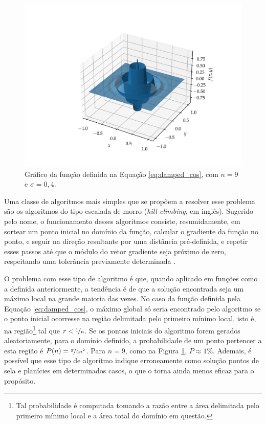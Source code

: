 \begin{figure}
  \centering
  \includegraphics[width=\textwidth]{imagens/damped_cossine.png}
  \caption{Gráfico da função definida na Equação \ref{eq:damped_cos}, com $ n = 9 $ e $ \sigma = 0,4 $.}
  \label{fig:damped_cos}
\end{figure}

Uma classe de algoritmos mais simples que se propõem a resolver esse problema são os algoritmos do
tipo escalada de morro (\textit{hill climbing}, em inglês). 
Sugerido pelo nome, o funcionamento desses algoritmos consiste, resumidamente,
em sortear um ponto inicial no domínio da função, calcular o gradiente da função no ponto, e seguir
na direção resultante por uma distância pré-definida, e repetir esses passos até que o módulo do
vetor gradiente seja próximo de zero, respeitando uma tolerância previamente determinada  \cite{goldberg1989ga}. 

O problema com esse tipo de algoritmo é que, quando aplicado em funções como a definida anteriormente, a tendência é
de que a solução encontrada seja um máximo local na grande maioria das vezes. No caso da função definida
pela Equação \ref{eq:damped_cos}, o máximo global só seria encontrado pelo algoritmo se o ponto inicial
ocorresse na região delimitada pelo primeiro mínimo local, isto é, na região\footnote{
  Tal probabilidade é computada tomando a razão entre a área delimitada pelo primeiro mínimo local
  e a área total do domínio em questão.
}
tal que $ r < \nicefrac{1}{n} $. 
Se os pontos iniciais do algoritmo forem gerados aleatoriamente,
para o domínio definido, a probabilidade de um ponto pertencer a esta região é $ P(n) = \nicefrac{\pi}{4n^2} $.
Para $ n = 9 $, como na Figura \ref{fig:damped_cos}, $ P \approx 1\% $. 
Ademais, é possível que esse tipo
de algoritmo indique erroneamente como solução pontos de sela e planícies em determinados casos, o que o
torna ainda menos eficaz para o propósito.

